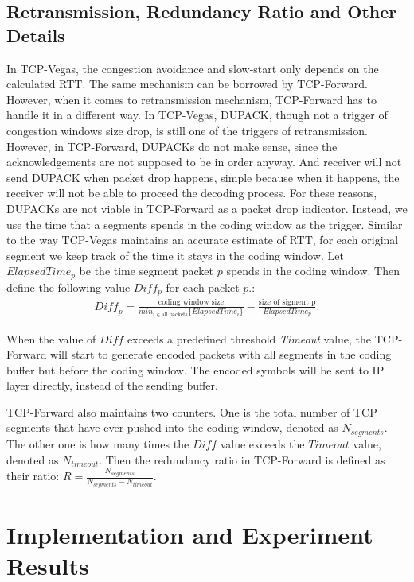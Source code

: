 \documentclass[10pt, conference, final, letterpaper]{IEEEtran}
\theoremstyle{definition}
\begin{document}
\subsection{Retransmission, Redundancy Ratio and Other Details}

In TCP-Vegas, the congestion avoidance and slow-start only depends on the calculated RTT. The same mechanism can be borrowed by TCP-Forward. However, when it comes to retransmission mechanism, TCP-Forward has to handle it in a different way. In TCP-Vegas, DUPACK, though not a trigger of congestion windows size drop, is still one of the triggers of retransmission. However, in TCP-Forward, DUPACKs do not make sense, since the acknowledgements are not supposed to be in order anyway. And receiver will not send DUPACK when packet drop happens, simple because when it happens, the receiver will not be able to proceed the decoding process. For these reasons, DUPACKs are not viable in TCP-Forward as a packet drop indicator. Instead, we use the time that a segments spends in the coding window as the trigger. Similar to the way TCP-Vegas maintains an accurate estimate of RTT, for each original segment we keep track of the time it stays in the coding window. Let $ElapsedTime_{p}$ be the time segment packet $p$ spends in the coding window. Then define the following value $Diff_{p}$ for each packet $p$.:
\begin{align}
	\textit{Diff}_{p} = \frac{\text{coding window size}}{min_{i \in \text{all packets}}\{ElapsedTime_{i}\}} - \frac{\text{size of sigment p}}{ElapsedTime_{p}}.
\end{align}

When the value of $\textit{Diff}$ exceeds a predefined threshold \textit{Timeout} value, the TCP-Forward will start to generate encoded packets with all segments in the coding buffer but before the coding window. The encoded symbols will be sent to IP layer directly, instead of the sending buffer.

TCP-Forward also maintains two counters. One is the total number of TCP segments that have ever pushed into the coding window, denoted as $N_{segments}$. The other one is how many times the $\textit{Diff}$ value exceeds the $Timeout$ value, denoted as $N_{timeout}$. Then the redundancy ratio in TCP-Forward is defined as their ratio: $R = \frac{N_{segments}}{N_{segments} - N_{timeout}}$.

\section{Implementation and Experiment Results}
\label{sec:TCP-Forward:experiment}
\end{document}
